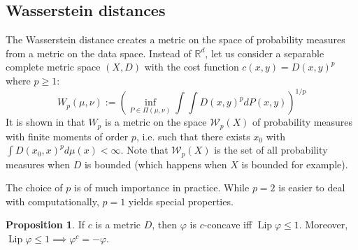 \documentclass{article}
\theoremstyle{definition}
\newtheorem{prop}{Proposition}[section]
\theoremstyle{remark}
\DeclareMathOperator{\lip}{Lip}
\begin{document}
\subsection{Wasserstein distances}

The Wasserstein distance creates a metric on the space of probability measures from a metric on the data space. Instead of $\mathbb R^d$, let us consider a separable complete metric space $(X,D)$ with the cost function $c(x,y) = D(x,y)^p$ where $p\geq 1$:
$$W_p(\mu, \nu) := \left(\inf_{P\in \Pi(\mu, \nu)} \int\int D(x,y)^p dP(x,y) \right)^{1/p}$$
It is shown in \cite{villani2003topics} that $W_p$ is a metric on the space $\mathcal W_p(X)$ of probability measures with finite moments of order $p$, i.e. such that there exists $x_0$ with $\int D(x_0,x)^p d\mu(x) <\infty$. Note that $\mathcal W_p(X)$ is the set of all probability measures when $D$ is bounded (which happens when $X$ is bounded for example).

The choice of $p$ is of much importance in practice. While $p=2$ is easier to deal with computationally, $p=1$ yields special properties.
\begin{prop}
If $c$ is a metric $D$, then $\varphi$ is $c$-concave iff $\lip \varphi \leq 1$. Moreover, $\lip \varphi \leq 1 \implies \varphi^c = -\varphi$.
\end{prop}
\end{document}
